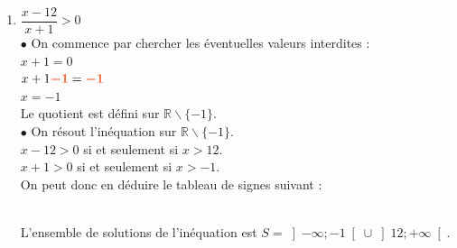 \documentclass[a4paper,11pt]{article}
\begin{document}
\begin{seanceD}{}
\begin{enumerate}
\item $\dfrac{x-12}{x+1} > 0$\\$\bullet$ On commence par chercher les éventuelles valeurs interdites :\\$x +1 = 0$ \\$x +1 {\color[HTML]{f15929}\boldsymbol{-1}} = {\color[HTML]{f15929}\boldsymbol{-1}}$\\$x = -1$\\Le quotient est défini sur $\mathbb{R} \smallsetminus \{-1\}$.\\$\bullet$ On résout l'inéquation sur $\mathbb{R} \smallsetminus \{-1\}$.\\$x -12 > 0$ si et seulement si $x > 12$.\\$x+1 > 0$ si et seulement si $x > -1$.\\On peut donc en déduire le tableau de signes suivant :\\
\\ L'ensemble de solutions de l'inéquation est $S = \left] -\infty ; -1 \right[ \cup \left] 12; +\infty \right[ $.
\end{enumerate}
\end{seanceD}
\end{document}
